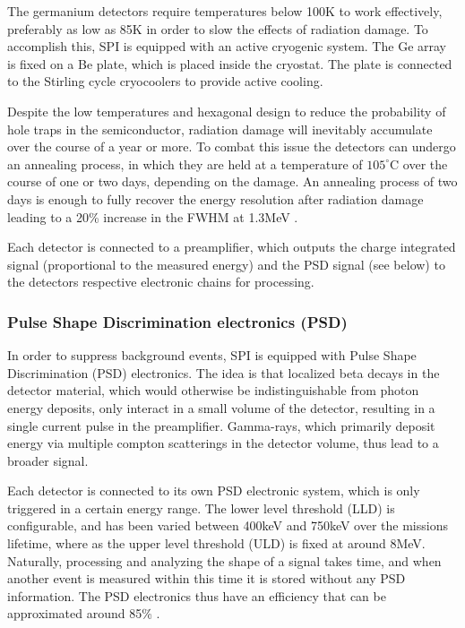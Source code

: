 \documentclass{report}
\begin{document}
The germanium detectors require temperatures below 100K to work effectively, preferably as low as 85K in order to slow the effects of radiation damage. To accomplish this, SPI is equipped with an active cryogenic system. The Ge array is fixed on a Be plate, which is placed inside the cryostat. The plate is connected to the Stirling cycle cryocoolers to provide active cooling. 

Despite the low temperatures and hexagonal design to reduce the probability of hole traps in the semiconductor, radiation damage will inevitably accumulate over the course of a year or more. To combat this issue the detectors can undergo an annealing process, in which they are held at a temperature of $105^\circ \text{C}$ over the course of one or two days, depending on the damage. An annealing process of two days is enough to fully recover the energy resolution after radiation damage leading to a 20\% increase in the FWHM at 1.3MeV \cite{refId0}.

Each detector is connected to a preamplifier, which outputs the charge integrated signal (proportional to the measured energy) and the PSD signal (see below) to the detectors respective electronic chains for processing.

\subsubsection*{Pulse Shape Discrimination electronics (PSD)}



In order to suppress background events, SPI is equipped with Pulse Shape Discrimination (PSD) electronics. The idea is that localized beta decays in the detector material, which would otherwise be indistinguishable from photon energy deposits, only interact in a small volume of the detector, resulting in a single current pulse in the preamplifier. Gamma-rays, which primarily deposit energy via multiple compton scatterings in the detector volume, thus lead to a broader signal. 

Each detector is connected to its own PSD electronic system, which is only triggered in a certain energy range. The lower level threshold (LLD) is configurable, and has been varied between 400keV and 750keV over the missions lifetime, where as the upper level threshold (ULD) is fixed at around 8MeV. Naturally, processing and analyzing the shape of a signal takes time, and when another event is measured within this time it is stored without any PSD information. The PSD electronics thus have an efficiency that can be approximated around 85\% \cite{Roques}.
\end{document}
